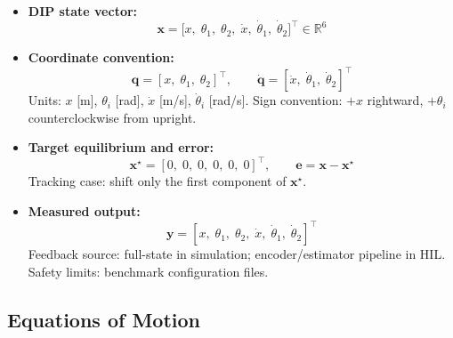 \documentclass[10pt, a4paper]{article}
\newcommand{\vx}{\boldsymbol{x}}
\newcommand{\vq}{\boldsymbol{q}}
\newcommand{\R}{\mathbb{R}}
\begin{document}
\begin{itemize}[leftmargin=1.5em,itemsep=0.2em]
  \item \textbf{DIP state vector:}
  \begin{equation}
    \vx = \bigl[x,\; \theta_1,\; \theta_2,\; \dot{x},\; \dot{\theta}_1,\;
                \dot{\theta}_2\bigr]^\top \in \R^6
    \label{eq:state}
  \end{equation}

  \item \textbf{Coordinate convention:}
  \begin{equation}
    \vq = [x,\; \theta_1,\; \theta_2]^\top, \qquad
    \dot{\vq} = [\dot{x},\; \dot{\theta}_1,\; \dot{\theta}_2]^\top
  \end{equation}
  Units: $x$ [m], $\theta_i$ [rad], $\dot{x}$ [m/s], $\dot{\theta}_i$ [rad/s].
  Sign convention: $+x$ rightward, $+\theta_i$ counterclockwise from upright.

  \item \textbf{Target equilibrium and error:}
  \begin{equation}
    \vx^\star = [0,\;0,\;0,\;0,\;0,\;0]^\top, \qquad
    \mathbf{e} = \vx - \vx^\star
    \label{eq:state_error}
  \end{equation}
  Tracking case: shift only the first component of $\vx^\star$.

  \item \textbf{Measured output:}
  \begin{equation}
    \bm{y} = [x,\; \theta_1,\; \theta_2,\; \dot{x},\; \dot{\theta}_1,\;
              \dot{\theta}_2]^\top
  \end{equation}
  Feedback source: full-state in simulation; encoder/estimator pipeline in HIL.
  Safety limits: benchmark configuration files.
\end{itemize}

\subsection{Equations of Motion}
\end{document}
